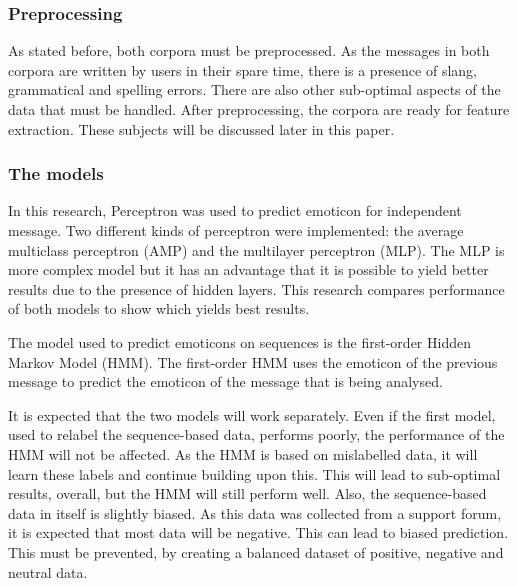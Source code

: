 \subsubsection*{Preprocessing} 
As stated before, both corpora must be preprocessed. As the messages in both corpora are written by users in their spare time, there is a presence of slang, grammatical and spelling errors. There are also other sub-optimal aspects of the data that must be handled. After preprocessing, the corpora are ready for feature extraction. These subjects will be discussed later in this paper.


\subsubsection*{The models} 
In this research, Perceptron was used to predict emoticon for independent message.
Two different kinds of perceptron were implemented: the average multiclass perceptron (AMP) and the multilayer perceptron (MLP).
The MLP is more complex model but it has an advantage that it is possible to yield better results due to the presence of hidden layers.
This research compares performance of both models to show which yields best results.


The model used to predict emoticons on sequences is the first-order Hidden Markov Model (HMM).
The first-order HMM uses the emoticon of the previous message to predict the emoticon of the message that is being analysed.

It is expected that the two models will work separately. Even if the first model, used to relabel the sequence-based data, performs poorly, the performance of the HMM will not be affected. As the HMM is based on mislabelled data, it will learn these labels and continue building upon this. This will lead to sub-optimal results, overall, but the HMM will still perform well. Also, the sequence-based data in itself is slightly biased. As this data was collected from a support forum, it is expected that most data will be negative. This can lead to biased prediction. This must be prevented, by creating a balanced dataset of positive, negative and neutral data. 

